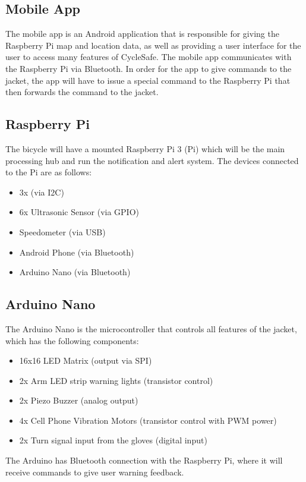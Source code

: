 \documentclass[journal]{IEEEtran}
\begin{document}
\subsection{Mobile App}
The mobile app is an Android application that is responsible for giving the Raspberry Pi map and location data, as well as providing a user interface for the user to access many features of CycleSafe. The mobile app communicates with the Raspberry Pi via Bluetooth. In order for the app to give commands to the jacket, the app will have to issue a special command to the Raspberry Pi that then forwards the command to the jacket.

\subsection{Raspberry Pi}
The bicycle will have a mounted Raspberry Pi 3 (Pi) which will be the main processing hub and run the notification and alert system. The devices connected to the Pi are as follows:
\begin{itemize}
    \item 3x \lidar{} (via I2C)
    \item 6x Ultrasonic Sensor \sonar{} (via GPIO)
    \item Speedometer (via USB)
    \item Android Phone (via Bluetooth)
    \item Arduino Nano (via Bluetooth)
\end{itemize}

\subsection{Arduino Nano}
The Arduino Nano is the microcontroller that controls all features of the jacket, which has the following components:
\begin{itemize}
    \item 16x16 LED Matrix (output via SPI)
    \item 2x Arm LED strip warning lights (transistor control)
    \item 2x Piezo Buzzer (analog output)
    \item 4x Cell Phone Vibration Motors (transistor control with PWM power)
    \item 2x Turn signal input from the gloves (digital input)
\end{itemize}
The Arduino has Bluetooth connection with the Raspberry Pi, where it will receive commands to give user warning feedback.
\end{document}
